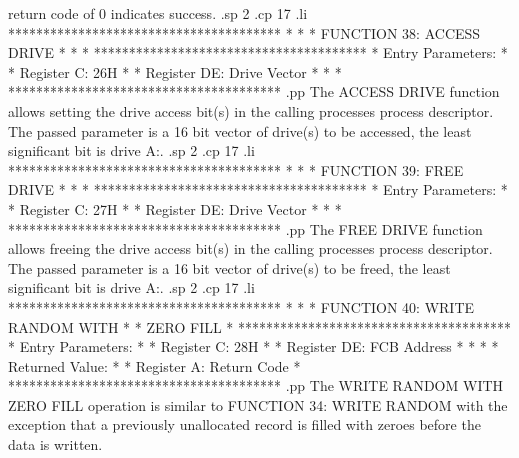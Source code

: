return code of 0 indicates success.                 
.sp 2
.cp 17
.li
***************************************
*                                     *
*  FUNCTION 38:  ACCESS DRIVE         *
*                                     *
***************************************
*  Entry Parameters:                  *
*      Register   C:  26H             *
*      Register  DE:  Drive Vector    *
*                                     *
***************************************
.pp
The  ACCESS  DRIVE function allows setting the  drive  access
bit(s)  in  the calling processes process descriptor.  The  passed
parameter is a 16 bit vector of drive(s) to be accessed,  the least
significant bit is drive A:.
.sp 2
.cp 17
.li
***************************************
*                                     *
*  FUNCTION 39:  FREE DRIVE           *
*                                     *
***************************************
*  Entry Parameters:                  *
*      Register   C:  27H             *
*      Register  DE:  Drive Vector    *
*                                     *
***************************************
.pp
The  FREE  DRIVE  function allows freeing  the  drive  access
bit(s)  in the calling processes process  descriptor.  The  passed
parameter  is  a 16 bit vector of drive(s) to be freed,  the  least
significant bit is drive A:.
.sp 2
.cp 17
.li
***************************************
*                                     *
*  FUNCTION 40:  WRITE RANDOM WITH    *
*                   ZERO FILL         *
***************************************
*  Entry Parameters:                  *
*      Register   C:  28H             *
*      Register  DE:  FCB Address     *
*                                     *
*  Returned Value:                    *
*      Register   A:  Return Code     *
***************************************
.pp
The  WRITE  RANDOM  WITH ZERO FILL operation  is  similar  to
FUNCTION  34: WRITE RANDOM with the exception that a previously unallocated
record is filled with zeroes before the data is written.
